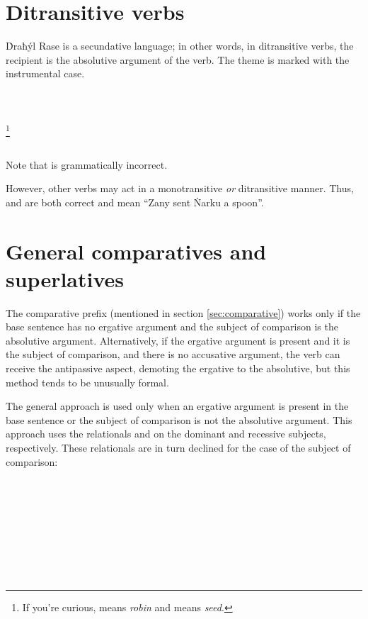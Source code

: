 \documentclass{book}
\begin{document}
\section{Ditransitive verbs}

Ḋraħýl Rase is a secundative language; in other words, in ditransitive verbs, the recipient is the absolutive argument of the verb. The theme is marked with the instrumental case. \\
~\\
    \\
    \\
\emph{   }\footnote{If you're curious,  means \emph{robin} and  means \emph{seed}.} \\
~

Note that  is grammatically incorrect.

However, other verbs may act in a monotransitive \emph{or} ditransitive manner. Thus,  and  are both correct and mean ``Zany sent Ṅarku a spoon''.

\section{General comparatives and superlatives}

The comparative prefix  (mentioned in section \ref{sec:comparative}) works only if the base sentence has no ergative argument and the subject of comparison is the absolutive argument. Alternatively, if the ergative argument is present and it is the subject of comparison, and there is no accusative argument, the verb can receive the antipassive aspect, demoting the ergative to the absolutive, but this method tends to be unusually formal.

The general approach is used only when an ergative argument is present in the base sentence or the subject of comparison is not the absolutive argument. This approach uses the relationals  and  on the dominant and recessive subjects, respectively. These relationals are in turn declined for the case of the subject of comparison: \\
~\\
    \\
    \\
    \\
~\\
    \\
    \\
     \\
\end{document}
